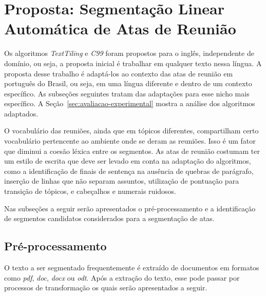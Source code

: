 \section{Proposta: Segmentação Linear Automática de Atas de Reunião}
	\label{sec:proposta}






Os algoritmos \textit{TextTiling} e \textit{C99} foram propostos para o inglês, independente de domínio, ou seja, a proposta inicial é trabalhar em qualquer texto nessa língua.
A proposta desse trabalho é adaptá-los ao contexto das atas de reunião em português do Brasil, ou seja, em uma língua diferente e dentro de um contexto específico. As subseções seguintes tratam das adaptações para esse nicho mais específico. A Seção~\ref{sec:avaliacao-experimental} mostra a análise dos algoritmos adaptados.

O vocabulário das reuniões, ainda que em tópicos diferentes, compartilham certo vocabulário pertencente ao ambiente onde se deram as reuniões. Isso é um fator que diminui a coesão léxica entre os segmentos.
As atas de reunião costumam ter um estilo de escrita que deve ser levado em conta na adaptação do algoritmos, como a identificação de finais de sentença na ausência de quebras de parágrafo, inserção de linhas que não separam assuntos, utilização de pontuação para transição de tópicos, e cabeçalhos e numerais ruidosos. 

Nas subseções a seguir serão apresentados o pré-processamento e a identificação de segmentos candidatos considerados para a segmentação de atas.





\subsection{Pré-processamento}
	\label{subsec:preprocessamento}




	O texto a ser segmentado frequentemente é extraído de documentos em formatos como \textit{pdf}, \textit{doc}, \textit{docx} ou \textit{odt}. Após a extração do texto, esse pode passar por processos de transformação os quais serão apresentados a seguir.

